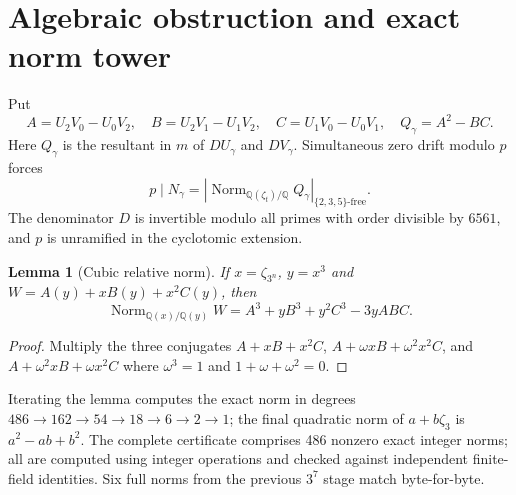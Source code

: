 \documentclass[9pt]{extarticle}
\newtheorem{lemma}{Lemma}
\DeclareMathOperator{\Norm}{Norm}
\begin{document}
\section{Algebraic obstruction and exact norm tower}
Put
\[
A=U_2V_0-U_0V_2,\quad B=U_2V_1-U_1V_2,\quad
C=U_1V_0-U_0V_1,\quad Q_\gamma=A^2-BC.
\]
Here $Q_\gamma$ is the resultant in $m$ of $DU_\gamma$ and $DV_\gamma$. Simultaneous zero drift modulo $p$ forces
\[
p\mid N_\gamma=
\left|\Norm_{\mathbb Q(\zeta_t)/\mathbb Q}Q_\gamma\right|_{\{2,3,5\}\text{-free}}.
\]
The denominator $D$ is invertible modulo all primes with order divisible by $6561$, and $p$ is unramified in the cyclotomic extension.

\begin{lemma}[Cubic relative norm]\label{lem:tower}
If $x=\zeta_{3^n}$, $y=x^3$ and $W=A(y)+xB(y)+x^2C(y)$, then
\[
\Norm_{\mathbb Q(x)/\mathbb Q(y)}W
=A^3+yB^3+y^2C^3-3yABC.
\]
\end{lemma}
\begin{proof}
Multiply the three conjugates $A+xB+x^2C$, $A+\omega xB+\omega^2x^2C$, and $A+\omega^2xB+\omega x^2C$ where $\omega^3=1$ and $1+\omega+\omega^2=0$.
\end{proof}
Iterating the lemma computes the exact norm in degrees $486\to162\to54\to18\to6\to2\to1$; the final quadratic norm of $a+b\zeta_3$ is $a^2-ab+b^2$. The complete certificate comprises 486 nonzero exact integer norms; all are computed using integer operations and checked against independent finite-field identities. Six full norms from the previous $3^7$ stage match byte-for-byte.
\end{document}
